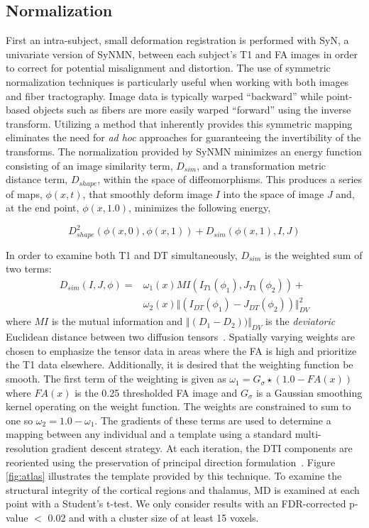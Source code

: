 \subsection{Normalization}
First an intra-subject, small deformation registration is performed with SyN, a univariate version of SyNMN, between each subject's T1 and FA images in order to correct for potential misalignment and distortion. The use of symmetric normalization techniques is particularly useful when working with both images and fiber tractography.  Image data is typically warped ``backward'' while point-based objects such as fibers are more easily warped ``forward'' using the inverse transform. Utilizing a method that inherently provides this symmetric mapping eliminates the need for {\em ad hoc} approaches for guaranteeing the invertibility of the transforms.
The normalization provided by SyNMN minimizes an energy function consisting of an image similarity term, $D_{sim}$, and a transformation metric distance term, $D_{shape}$, within the space of diffeomorphisms. This produces a series of maps, $\phi(x,t)$, that smoothly deform image $I$ into the space of image $J$ and, at the end point, $\phi(x,1.0)$, minimizes the following energy,

\begin{equation}
D_{shape}^2(\phi(x,0),\phi(x,1)) + D_{sim}(\phi(x,1),I,J)
\end {equation}

In order to examine both T1 and DT simultaneously, $D_{sim}$ is the weighted sum of two terms:
\begin{eqnarray}
D_{sim}(I,J,\phi) =& \omega_1(x)MI(I_{T1}(\phi_1),J_{T1}(\phi_2)) + \nonumber \\ &  \omega_2(x)\Vert(I_{DT}(\phi_1) - J_{DT}(\phi_2))\Vert_{DV}^2
\end{eqnarray}
where $MI$ is the mutual information and $\Vert(D_1 - D_2))\Vert_{DV}$ is the {\em deviatoric} Euclidean distance between two diffusion tensors~\cite{Alexander99}. Spatially varying weights are chosen to emphasize the tensor data in areas where the FA is high and prioritize the T1 data elsewhere. Additionally, it is desired that the weighting function be smooth. The first term of the weighting is given as $\omega_1 = G_{\sigma} \star (1.0 - FA(x))$ where $FA(x)$ is the 0.25 thresholded FA image and $G_{\sigma}$ is a Gaussian smoothing kernel operating on the weight function. The weights are constrained to sum to one so $\omega_2 = 1.0 - \omega_1$. The gradients of these terms are used to determine a mapping between any individual and a template using a standard multi-resolution gradient descent strategy. At each iteration, the DTI components are reoriented using the preservation of principal direction formulation~\cite{Alexander01}. Figure \ref{fig:atlas} illustrates the template provided by this technique. To examine the structural integrity of the cortical regions and thalamus, MD is examined at each point with a Student's t-test. We only consider results with an FDR-corrected p-value $<$ 0.02 and with a cluster size of at least 15 voxels.

